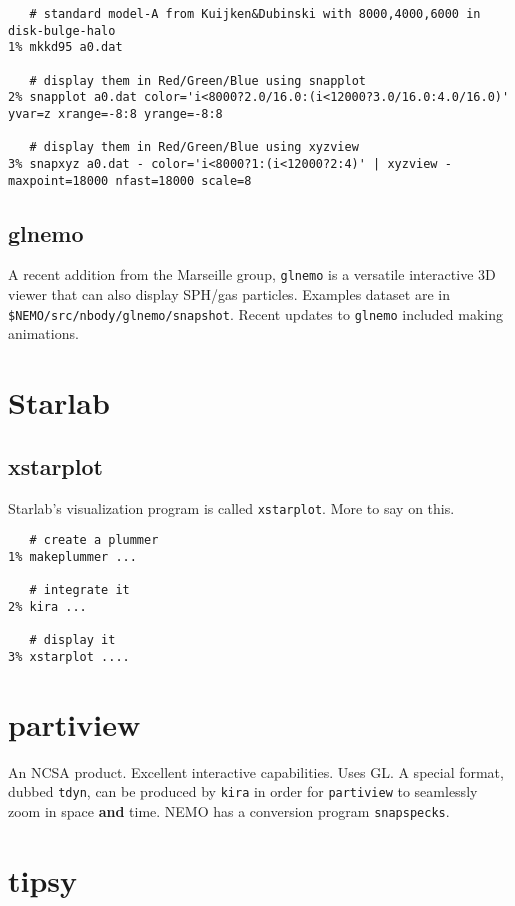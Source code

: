 \footnotesize\begin{verbatim}
   # standard model-A from Kuijken&Dubinski with 8000,4000,6000 in disk-bulge-halo
1% mkkd95 a0.dat

   # display them in Red/Green/Blue using snapplot 
2% snapplot a0.dat color='i<8000?2.0/16.0:(i<12000?3.0/16.0:4.0/16.0)' yvar=z xrange=-8:8 yrange=-8:8

   # display them in Red/Green/Blue using xyzview
3% snapxyz a0.dat - color='i<8000?1:(i<12000?2:4)' | xyzview - maxpoint=18000 nfast=18000 scale=8
\end{verbatim}\normalsize

\subsection{glnemo}

A recent addition from the Marseille group, {\tt glnemo} is a versatile 
interactive 3D viewer that can also display SPH/gas particles. Examples
dataset are in {\tt \$NEMO/src/nbody/glnemo/snapshot}. 
Recent updates to  {\tt glnemo} included making animations.

\section{Starlab}
\subsection{xstarplot}

Starlab's visualization program is called {\tt xstarplot}. More to say on this.

\footnotesize\begin{verbatim}
   # create a plummer
1% makeplummer ...

   # integrate it
2% kira ...

   # display it
3% xstarplot ....
\end{verbatim}\normalsize

\section{partiview}

An NCSA product. Excellent interactive capabilities. Uses GL. A special
format, dubbed {\tt tdyn}, can be produced by {\tt kira} in order for
{\tt partiview} to seamlessly zoom in space {\bf and} time. NEMO has
a conversion program {\tt snapspecks}.

\section{tipsy}

